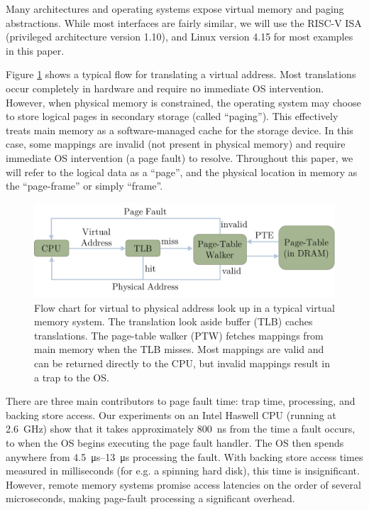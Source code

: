 Many architectures and operating systems expose virtual memory and paging
abstractions. While most interfaces are fairly similar, we will use the
RISC-V ISA (privileged architecture version 1.10\cite{riscv_priv110}), and
Linux version 4.15\cite{linux} for most examples in this paper.

Figure \ref{fig:generic_paging_flow} shows a typical flow for translating a
virtual address. Most translations occur completely in hardware and require no
immediate OS intervention. However, when physical memory is constrained, the
operating system may choose to store logical pages in secondary storage
(called ``paging''). This effectively treats main memory as a software-managed cache
for the storage device. In this case, some mappings are invalid (not present in
physical memory) and require immediate OS intervention (a page fault) to
resolve. Throughout this paper, we will refer to the logical data as a
``page'', and the physical location in memory as the ``page-frame'' or simply
``frame''.

\begin{figure}[h]
    \centering
    \includegraphics[width=0.9\columnwidth]{figs/generic_paging.pdf}
    \caption{Flow chart for virtual to physical address look up in a typical
      virtual memory system. The translation look aside buffer (TLB) caches
      translations. The page-table walker (PTW) fetches mappings from main
      memory when the TLB misses. Most mappings are valid and can be returned
      directly to the CPU, but invalid mappings result in a trap to the OS.}
    \label{fig:generic_paging_flow}
\end{figure}

There are three main contributors to page fault time: trap time, processing,
and backing store access. Our experiments on an Intel Haswell CPU (running at
\SI{2.6}{\giga\hertz}) show that it takes approximately \SI{800}{\nano\second}
from the time a fault occurs, to when the OS begins executing the page fault
handler. The OS then spends anywhere from \SIrange{4.5}{13}{\micro\second}
processing the fault. With backing store access times measured in milliseconds
(for e.g. a spinning hard disk), this time is insignificant. However, remote
memory systems promise access latencies on the order of several microseconds,
making page-fault processing a significant overhead.

